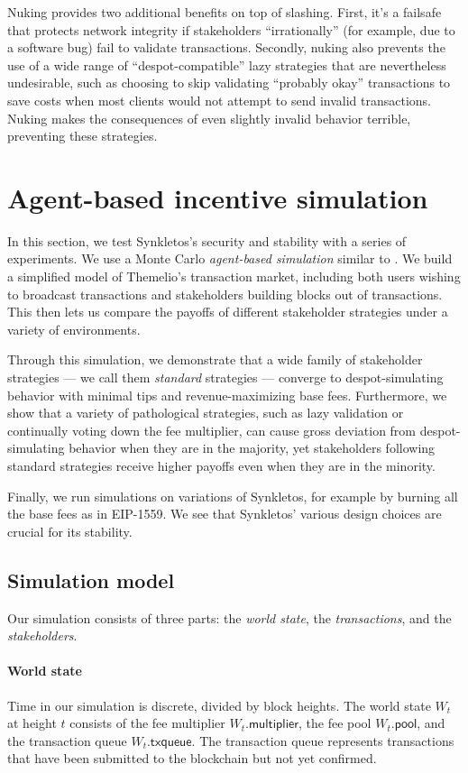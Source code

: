 \documentclass[letterpaper,12pt,oneside]{article}
\begin{document}
Nuking provides two additional benefits on top of slashing. First, it's a failsafe that protects network integrity if stakeholders ``irrationally'' (for example, due to a software bug) fail to validate transactions. Secondly, nuking also prevents the use of a wide range of ``despot-compatible'' lazy strategies that are nevertheless undesirable, such as choosing to skip validating ``probably okay'' transactions to save costs when most clients would not attempt to send invalid transactions. Nuking makes the consequences of even slightly invalid behavior terrible, preventing these strategies.

\section{Agent-based incentive simulation}

In this section, we test Synkletos's security and stability with a series of experiments. We use a Monte Carlo \emph{agent-based simulation} similar to \cite{chitra2019agent}. We build a simplified model of Themelio's transaction market, including both users wishing to broadcast transactions and stakeholders building blocks out of transactions. This then lets us compare the payoffs of different stakeholder strategies under a variety of environments.

Through this simulation, we demonstrate that a wide family of stakeholder strategies --- we call them \emph{standard} strategies --- converge to despot-simulating behavior with minimal tips and revenue-maximizing base fees. Furthermore, we show that a variety of pathological strategies, such as lazy validation or continually voting down the fee multiplier, can cause gross deviation from despot-simulating behavior when they are in the majority, yet stakeholders following standard strategies receive higher payoffs even when they are in the minority.

Finally, we run simulations on variations of Synkletos, for example by burning all the base fees as in EIP-1559. We see that Synkletos' various design choices are crucial for its stability.

\subsection{Simulation model}

Our simulation consists of three parts: the \emph{world state}, the \emph{transactions}, and the \emph{stakeholders}.

\paragraph*{World state} Time in our simulation is discrete, divided by block heights. The world state $W_t$ at height $t$ consists of the fee multiplier $W_t.\mathsf{multiplier}$, the fee pool $W_t.\mathsf{pool}$, and the transaction queue $W_t.\mathsf{txqueue}$. The transaction queue represents transactions that have been submitted to the blockchain but not yet confirmed.
\end{document}
